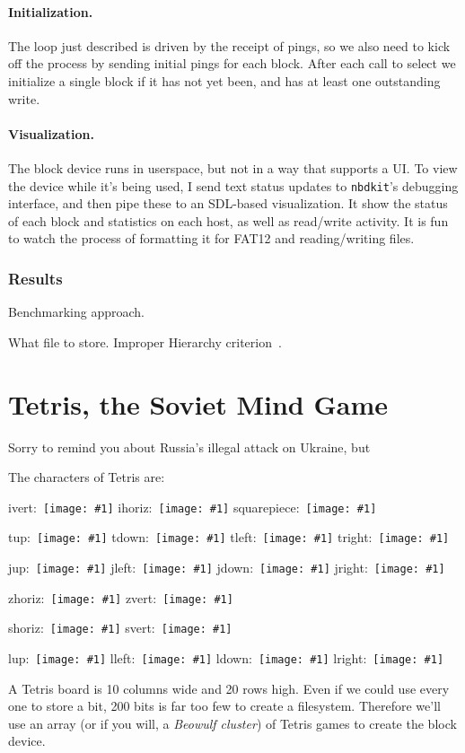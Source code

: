 \documentclass[twocolumn]{article}
\newcommand\tetrispiece[1]{\,\texttt{[image: \#1]}\hspace{0.1em}}
\newcommand\ivert{\tetrispiece{i_vert}}
\newcommand\ihoriz{\tetrispiece{i_horiz}}
\newcommand\squarepiece{\tetrispiece{square}}
\newcommand\tup{\tetrispiece{t_up}}
\newcommand\tdown{\tetrispiece{t_down}}
\newcommand\tleft{\tetrispiece{t_left}}
\newcommand\tright{\tetrispiece{t_right}}
\newcommand\jup{\tetrispiece{j_up}}
\newcommand\jleft{\tetrispiece{j_left}}
\newcommand\jdown{\tetrispiece{j_down}}
\newcommand\jright{\tetrispiece{j_right}}
\newcommand\zhoriz{\tetrispiece{z_horiz}}
\newcommand\zvert{\tetrispiece{z_vert}}
\newcommand\shoriz{\tetrispiece{s_horiz}}
\newcommand\svert{\tetrispiece{s_vert}}
\newcommand\lup{\tetrispiece{l_up}}
\newcommand\lleft{\tetrispiece{l_left}}
\newcommand\ldown{\tetrispiece{l_down}}
\newcommand\lright{\tetrispiece{l_right}}
\begin{document}
\paragraph{Initialization.} The loop just described is driven by
the receipt of pings, so we also need to kick off the process by
sending initial pings for each block. After each call to select
we initialize a single block if it has not yet been, and has at
least one outstanding write.

\paragraph{Visualization.} The block device runs in userspace,
but not in a way that supports a UI. To view the device while it's
being used, I send text status updates to {\tt nbdkit}'s debugging
interface, and then pipe these to an SDL-based visualization. It show
the status of each block and statistics on each host, as well as
read/write activity. It is fun to watch the process of formatting
it for FAT12 and reading/writing files.

\subsubsection{Results}

Benchmarking approach.

What file to store. Improper Hierarchy criterion~\cite{murphy2018improper}.



\section{Tetris, the Soviet Mind Game} \label{sec:tetru}

Sorry to remind you about Russia's illegal attack on Ukraine, but

The characters of Tetris are:

ivert: \ivert
ihoriz: \ihoriz
squarepiece: \squarepiece

tup: \tup
tdown: \tdown
tleft: \tleft
tright: \tright

jup: \jup
jleft: \jleft
jdown: \jdown
jright: \jright

zhoriz: \zhoriz
zvert: \zvert

shoriz: \shoriz
svert: \svert

lup: \lup
lleft: \lleft
ldown: \ldown
lright: \lright


A Tetris board is 10 columns wide and 20 rows high. Even if we could
use every one to store a bit, 200 bits is far too few to create a
filesystem. Therefore we'll use an array (or if you will, a {\em
  Beowulf cluster}) of Tetris games to create the block device.
\end{document}
